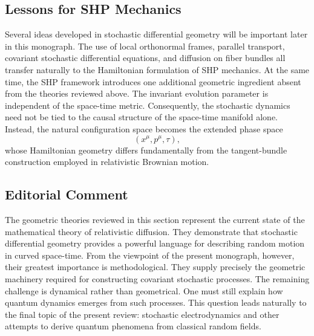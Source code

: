 \subsection{Lessons for SHP Mechanics}
Several ideas developed in stochastic differential geometry will be
important later in this monograph.
The use of local orthonormal frames,
parallel transport,
covariant stochastic differential equations,
and diffusion on fiber bundles
all transfer naturally to the Hamiltonian formulation of SHP mechanics.
At the same time,
the SHP framework introduces one additional geometric ingredient absent
from the theories reviewed above.
The invariant evolution parameter is independent of the space-time
metric.
Consequently,
the stochastic dynamics need not be tied to the causal structure of the
space-time manifold alone.
Instead,
the natural configuration space becomes the extended phase space
\[(x^\mu,p^\mu,\tau),\]
whose Hamiltonian geometry differs fundamentally from the tangent-bundle
construction employed in relativistic Brownian motion.
\subsection*{Editorial Comment}
The geometric theories reviewed in this section represent the current
state of the mathematical theory of relativistic diffusion.
They demonstrate that stochastic differential geometry provides a
powerful language for describing random motion in curved space-time.
From the viewpoint of the present monograph, however, their greatest
importance is methodological.
They supply precisely the geometric machinery required for constructing
covariant stochastic processes.
The remaining challenge is dynamical rather than geometrical.
One must still explain how quantum dynamics emerges from such
processes.
This question leads naturally to the final topic of the present review:
stochastic electrodynamics and other attempts to derive quantum
phenomena from classical random fields.
